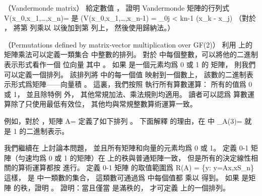 \startsubject[
  title={Problems},
]

\startPROBLEM
（Vandermonde matrix）
給定數值 ，
證明 Vandermonde 矩陣的行列式
\startformula
V(x_0,x_1,\ldots,x_n)=
\stopformula
是
\startformula
\det(V(x_0,x_1,\ldots,x_{n-1}) = \prod_{0\le j < k\le n-1} (x_k - x_j)
\stopformula
（\hint 對於 ，
將第  列乘以  以後加到第  列上，
然後使用歸納法。）
\stopPROBLEM

\startANSWER
{}
\stopANSWER

\startPROBLEM
（Permutations defined by matrix-vector multiplication over GF(2)）
利用  上的矩陣乘法可以定義一類集合 \m{S_n=\{0,1,2,\ldots,2^n-1]\}} 中整數的排列。
對於  中每個整數，可以將他的二進制表示形式看作一個  位向量
\startformula
{}
\stopformula
其中 。
如果  是一個元素均爲 0 或 1 的  矩陣，
則我們可以定義一個排列。
該排列將  中的每一個值  映射到一個數上，
該數的二進制表示形式爲矩陣——向量積 。
這裏，我們按照  執行所有算數運算：
所有的值爲 0 或 1，
並且除特例  外，
其他常規加法、乘法規則均適用。
讀者可以認爲  算數運算除了只使用最低有效位，
其他均與常規整數算術運算一致。

例如，對於 ，矩陣
\startformula
A=\left[\startmatrix
\NC 1 \NC 0 \NR
\NC 1 \NC 1 \NR
\stopmatrix\right]
\stopformula
定義了如下排列 。
下面解釋  的理由，在  中
\startformula
\pi_A(3)=
\left[\startmatrix
\NC 1 \NC 0 \NR
\NC 1 \NC 1 \NR
\stopmatrix\right]
\left[\startmatrix
\NC 1 \NC 1 \NR
\stopmatrix\right]
\left[\startmatrix
\NC 1 \NR
\NC 0 \NR
\stopmatrix\right]
\stopformula
就是 1 的二進制表示。

我們繼續在  上討論本問題，
並且所有矩陣和向量的元素均爲 0 或 1。
定義 0-1 矩陣（勻速均爲 0 或 1 的矩陣）在  上的秩與普通矩陣一致，
但是所有的決定線性相關的算術運算都按  進行。
定義  0-1 矩陣  的取值範圍爲
\startformula
R(A) = \{y: y=Ax,x\in S_n\}
\stopformula
這樣，  是  中一類數的集合，
這類數可通過爲  中每個值都  乘以  得到。
\startigBase[a]\startitem
如果  是矩陣  的秩，證明 。
證明：當且僅當  是滿秩的，  才可定義  上的一個排列。
\stopitem\stopigBase

